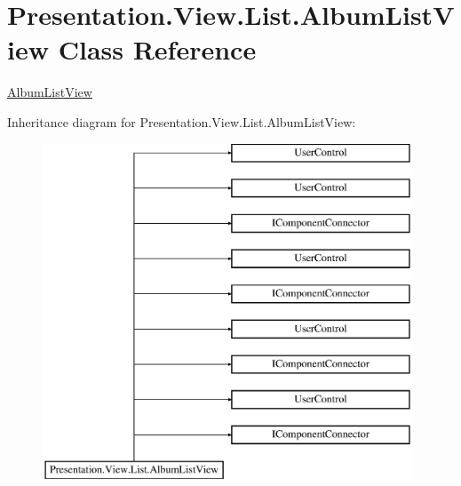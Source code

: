 \hypertarget{class_presentation_1_1_view_1_1_list_1_1_album_list_view}{}\section{Presentation.\+View.\+List.\+Album\+List\+View Class Reference}
\label{class_presentation_1_1_view_1_1_list_1_1_album_list_view}


\hyperlink{class_presentation_1_1_view_1_1_list_1_1_album_list_view}{Album\+List\+View}  


Inheritance diagram for Presentation.\+View.\+List.\+Album\+List\+View\+:\begin{figure}[H]
\begin{center}
\leavevmode
\includegraphics[height=10.000000cm]{class_presentation_1_1_view_1_1_list_1_1_album_list_view}
\end{center}
\end{figure}
